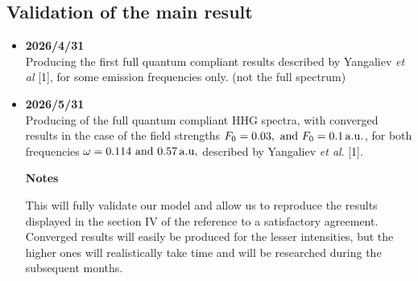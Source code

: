 \documentclass[11pt]{article}
\begin{document}
\subsection{Validation of the main result}
\begin{itemize}
\item \textbf{2026/4/31} \\
\indent Producing the first full quantum compliant results 
		described by Yangaliev \textit{et al} [1], 
        for some emission frequencies only. (not the full spectrum)
         
\item \textbf{2026/5/31} \\
\indent Producing of the full quantum compliant HHG spectra, with 
        converged results in the case of the field strengths 
        $F_0 = 0.03,\mbox{ and }F_0 = 0.1\,\rm a.u.$, for both frequencies 
        $\omega= 0.114\mbox{ and }0.57\,\rm a.u,$
		described by Yangaliev \textit{et al}. [1].

\textbf{Notes}

This will fully validate our model and allow us to reproduce 
the results displayed in the section IV of the reference 
to a satisfactory agreement. Converged results will easily be produced for the 
lesser intensities, but the higher ones will realistically take time 
and will be researched during the subsequent months.


\end{itemize}
\end{document}
